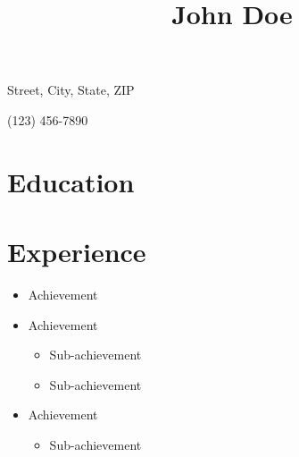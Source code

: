 \documentclass[11pt,letterpaper]{article}
\title{John Doe}
\begin{document}
\maketitle
\thispagestyle{empty}

\begin{personal}
  \item Street, City, State, ZIP
  \item (123) 456-7890  %
  \item {}
\end{personal}

\section{Education} %



\section{Experience} %

\lipsum[1][1-4]

\begin{itemize}
  \item Achievement

  \item Achievement
  \begin{itemize}
    \item Sub-achievement
    \item Sub-achievement
  \end{itemize}

  \item Achievement
  \begin{itemize}
    \item Sub-achievement
  \end{itemize}
\end{itemize}
\lipsum[1][5-9]
\end{document}

